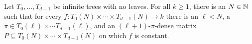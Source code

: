 \begin{theorem}\label{thm:combinatorial-finite-hapern-lauchli}
	Let $T_0,\ldots,T_{d-1}$ be infinite trees with no leaves. For all $k \geq 1$, there is an $N \in \mathbb{N}$ such that for every $f: T_0(N) \times \cdots \times T_{d-1}(N) \to k$ there is an $\ell < N$, a $\pi \in T_0(\ell) \times \cdots T_{d-1}(\ell)$, and an $(\ell+1)$-$\pi$-dense matrix $P \subseteq T_0(N) \times \cdots \times T_{d-1}(N)$ on which $f$ is constant.
\end{theorem}
